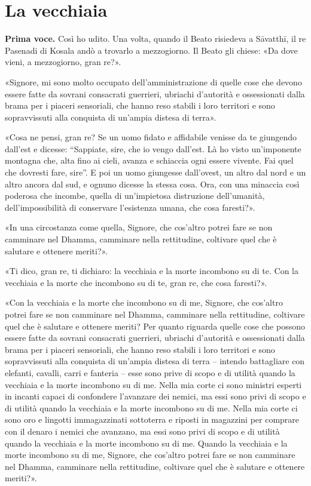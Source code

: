 \chapter{La vecchiaia}

\textbf{Prima voce.} Così ho udito. Una volta, quando il Beato risiedeva a
Sāvatthī, il re Pasenadi di Kosala andò a trovarlo a mezzogiorno. Il
Beato gli chiese: «Da dove vieni, a mezzogiorno, gran re?».


«Signore, mi sono molto occupato dell’amministrazione di quelle cose che
devono essere fatte da sovrani consacrati guerrieri, ubriachi d’autorità
e ossessionati dalla brama per i piaceri sensoriali, che hanno reso
stabili i loro territori e sono sopravvissuti alla conquista di un’ampia
distesa di terra».


«Cosa ne pensi, gran re? Se un uomo fidato e affidabile venisse da te
giungendo dall’est e dicesse: “Sappiate, sire, che io vengo dall’est. Là
ho visto un’imponente montagna che, alta fino ai cieli, avanza e
schiaccia ogni essere vivente. Fai quel che dovresti fare, sire”. E poi
un uomo giungesse dall’ovest, un altro dal nord e un altro ancora dal
sud, e ognuno dicesse la stessa cosa. Ora, con una minaccia così
poderosa che incombe, quella di un’impietosa distruzione dell’umanità,
dell’impossibilità di conservare l’esistenza umana, che cosa faresti?».


«In una circostanza come quella, Signore, che cos’altro potrei fare se
non camminare nel Dhamma, camminare nella rettitudine, coltivare quel
che è salutare e ottenere meriti?».


«Ti dico, gran re, ti dichiaro: la vecchiaia e la morte incombono su di
te. Con la vecchiaia e la morte che incombono su di te, gran re, che
cosa faresti?».


«Con la vecchiaia e la morte che incombono su di me, Signore, che
cos’altro potrei fare se non camminare nel Dhamma, camminare nella
rettitudine, coltivare quel che è salutare e ottenere meriti? Per quanto
riguarda quelle cose che possono essere fatte da sovrani consacrati
guerrieri, ubriachi d’autorità e ossessionati dalla brama per i piaceri
sensoriali, che hanno reso stabili i loro territori e sono sopravvissuti
alla conquista di un’ampia distesa di terra – intendo battagliare con
elefanti, cavalli, carri e fanteria – esse sono prive di scopo e di
utilità quando la vecchiaia e la morte incombono su di me. Nella mia
corte ci sono ministri esperti in incanti capaci di confondere
l’avanzare dei nemici, ma essi sono privi di scopo e di utilità quando
la vecchiaia e la morte incombono su di me. Nella mia corte ci sono oro
e lingotti immagazzinati sottoterra e riposti in magazzini per comprare
con il denaro i nemici che avanzano, ma essi sono privi di scopo e di
utilità quando la vecchiaia e la morte incombono su di me. Quando la
vecchiaia e la morte incombono su di me, Signore, che cos’altro potrei
fare se non camminare nel Dhamma, camminare nella rettitudine, coltivare
quel che è salutare e ottenere meriti?».


